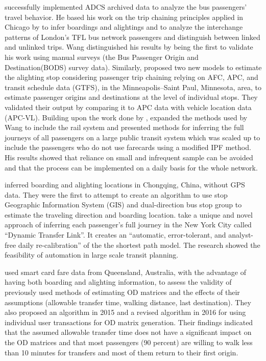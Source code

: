 \documentclass[11pt,twoside]{article}
\numberwithin{equation}{section}
\newcommand{\?}{\stackrel{?}{=}}
\begin{document}
\citet{wangBusPassengerOrigindestination2010} successfully implemented ADCS archived data to analyze the bus passengers' travel behavior. He based his work on the trip chaining principles applied in Chicago by \citet{cuiBusPassengerOriginDestination2006} to infer boardings and alightings and to analyze the interchange patterns of London's TFL bus network passengers and distinguish between linked and unlinked trips. Wang distinguished his results by being the first to validate his work using manual surveys (the Bus Passenger Origin and Destination(BODS) survey data). Similarly, \citet{nassirTransitStopLevelOrigin2011} proposed two new models to estimate the alighting stop considering passenger trip chaining relying on AFC, APC, and transit schedule data (GTFS), in the Minneapolis–Saint Paul, Minnesota, area, to estimate passenger origins and destinations at the level of individual stops. They validated their output by comparing it to APC data with vehicle location data (APC-VL). Building upon the work done by \citet{wangBusPassengerOrigindestination2010}, \citet{gordonIntermodalPassengerFlows2012} expanded the methods used by Wang to include the rail system and presented methods for inferring the full journeys of all passengers on a large public transit system which was scaled up to include the passengers who do not use farecards using a modified IPF method. His results showed that reliance on small and infrequent sample can be avoided and that the process can be implemented on a daily basis for the whole network.
 
\citet{chenBusPassengerOriginDestination2013a} inferred boarding and alighting locations in Chongqing, China, without GPS data. They were the first to attempt to create an algorithm to use stop Geographic Information System (GIS) and dual-direction bus stop group to estimate the traveling direction and boarding location. \citet{zengDevelopNewYork2015} take a unique and novel approach of inferring each passenger's full journey in the New York City called ``Dynamic Transfer Link''. It creates an ``automatic, error-tolerant, and analyst-free daily re-calibration'' of the the shortest path model.  The research showed the feasibility of automation in large scale transit planning.
 
\citet{alsgerUseSmartCard2015, alsgerValidatingImprovingPublic2016} used smart card fare data from Queensland, Australia, with the advantage of having both boarding and alighting information, to assess the validity of previously used methods of estimating OD matrices and the effects of their assumptions (allowable transfer time, walking distance, last destination). They also proposed an algorithm in 2015 and a revised algorithm in 2016 for using individual user transactions for OD matrix generation. Their findings indicated that the assumed allowable transfer time does not have a significant impact on the OD matrices and that most passengers (90 percent) are willing to walk less than 10 minutes for transfers and most of them return to their first origin.
\end{document}
